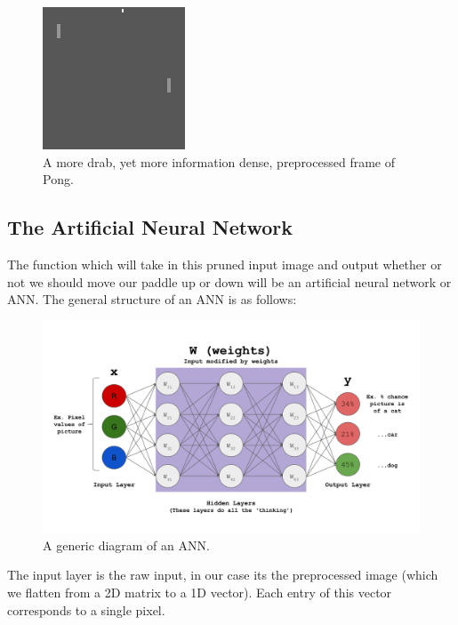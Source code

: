 \documentclass{article}
\begin{document}
\begin{figure}[h]
\centering
\includegraphics{frame_pp}
\caption*{A more drab, yet more information dense, preprocessed frame of Pong.}
\end{figure}

\vspace{-.1cm}

\subsection{The Artificial Neural Network}
The function which will take in this pruned input image and output whether or not we should move our paddle up or down will be an artificial neural network or ANN. The general structure of an ANN is as follows:

\vspace{-.4cm}
\begin{figure}[H]
\centering
\hspace*{-2cm}
\includegraphics[width=1.35\linewidth]{ann}
\vspace{-1.3cm}
\caption*{A generic diagram of an ANN.}
\end{figure}

The input layer is the raw input, in our case its the preprocessed image (which
we flatten from a 2D matrix to a 1D vector). Each entry of this vector corresponds to a single pixel.
\end{document}
